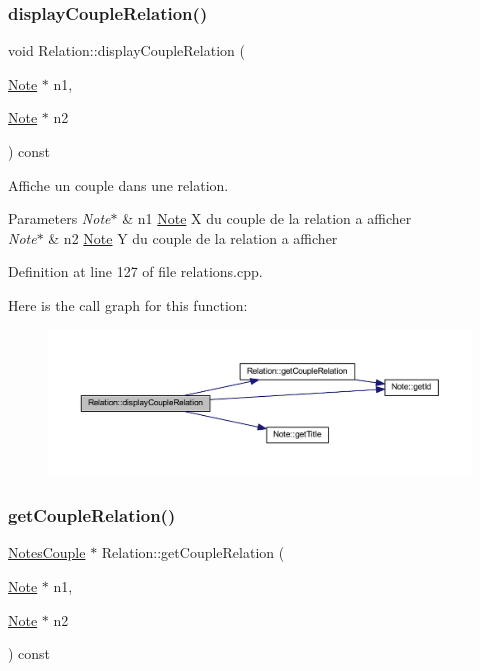 \subsubsection{\texorpdfstring{display\+Couple\+Relation()}{displayCoupleRelation()}}
{\footnotesize\ttfamily void Relation\+::display\+Couple\+Relation (\begin{DoxyParamCaption}\item[{\hyperlink{class_note}{Note} $\ast$}]{n1,  }\item[{\hyperlink{class_note}{Note} $\ast$}]{n2 }\end{DoxyParamCaption}) const}



Affiche un couple dans une relation. 


\begin{DoxyParams}{Parameters}
{\em Note$\ast$} & n1 \hyperlink{class_note}{Note} X du couple de la relation a afficher \\
\hline
{\em Note$\ast$} & n2 \hyperlink{class_note}{Note} Y du couple de la relation a afficher \\
\hline
\end{DoxyParams}


Definition at line 127 of file relations.\+cpp.

Here is the call graph for this function\+:\nopagebreak
\begin{figure}[H]
\begin{center}
\leavevmode
\includegraphics[width=350pt]{class_relation_aa6974a453611dee90f2ca2da9fe30de6_cgraph}
\end{center}
\end{figure}
\mbox{\label{class_relation_a086c39ecf396e3cfcb465fd9eea5a904}} 
\subsubsection{\texorpdfstring{get\+Couple\+Relation()}{getCoupleRelation()}}
{\footnotesize\ttfamily \hyperlink{class_notes_couple}{Notes\+Couple} $\ast$ Relation\+::get\+Couple\+Relation (\begin{DoxyParamCaption}\item[{\hyperlink{class_note}{Note} $\ast$}]{n1,  }\item[{\hyperlink{class_note}{Note} $\ast$}]{n2 }\end{DoxyParamCaption}) const}



